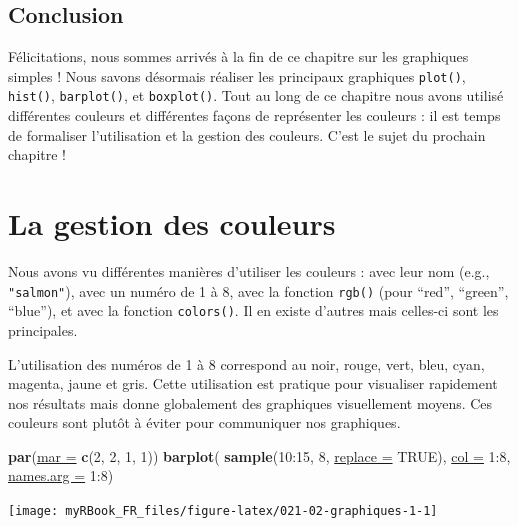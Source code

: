 \documentclass[twoside,symmetric]{book}
\newenvironment{Shaded}{}{}
\newcommand{\DataTypeTok}[1]{\underline{#1}}
\newcommand{\DecValTok}[1]{#1}
\newcommand{\KeywordTok}[1]{\textbf{#1}}
\newcommand{\NormalTok}[1]{#1}
\newcommand{\OperatorTok}[1]{#1}
\newcommand{\OtherTok}[1]{#1}
\begin{document}
\hypertarget{conclusion-8}{%
\section{Conclusion}\label{conclusion-8}}

Félicitations, nous sommes arrivés à la fin de ce chapitre sur les graphiques simples ! Nous savons désormais réaliser les principaux graphiques \texttt{plot()}, \texttt{hist()}, \texttt{barplot()}, et \texttt{boxplot()}. Tout au long de ce chapitre nous avons utilisé différentes couleurs et différentes façons de représenter les couleurs : il est temps de formaliser l'utilisation et la gestion des couleurs. C'est le sujet du prochain chapitre !

\hypertarget{graph2}{%
\chapter{La gestion des couleurs}\label{graph2}}

\minitoc

Nous avons vu différentes manières d'utiliser les couleurs : avec leur nom (e.g., \texttt{"salmon"}), avec un numéro de 1 à 8, avec la fonction \texttt{rgb()} (pour ``red'', ``green'', ``blue''), et avec la fonction \texttt{colors()}. Il en existe d'autres mais celles-ci sont les principales.

L'utilisation des numéros de 1 à 8 correspond au noir, rouge, vert, bleu, cyan, magenta, jaune et gris. Cette utilisation est pratique pour visualiser rapidement nos résultats mais donne globalement des graphiques visuellement moyens. Ces couleurs sont plutôt à éviter pour communiquer nos graphiques.

\begin{Shaded}
\begin{Highlighting}[]
\KeywordTok{par}\NormalTok{(}\DataTypeTok{mar =} \KeywordTok{c}\NormalTok{(}\DecValTok{2}\NormalTok{, }\DecValTok{2}\NormalTok{, }\DecValTok{1}\NormalTok{, }\DecValTok{1}\NormalTok{)) }
\KeywordTok{barplot}\NormalTok{(}
  \KeywordTok{sample}\NormalTok{(}\DecValTok{10}\OperatorTok{:}\DecValTok{15}\NormalTok{, }\DecValTok{8}\NormalTok{, }\DataTypeTok{replace =} \OtherTok{TRUE}\NormalTok{), }
  \DataTypeTok{col =} \DecValTok{1}\OperatorTok{:}\DecValTok{8}\NormalTok{, }
  \DataTypeTok{names.arg =} \DecValTok{1}\OperatorTok{:}\DecValTok{8}\NormalTok{)}
\end{Highlighting}
\end{Shaded}

\texttt{[image: myRBook\_FR\_files/figure-latex/021-02-graphiques-1-1]}
\end{document}

